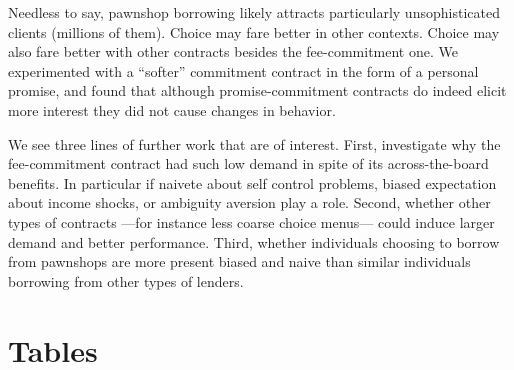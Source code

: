 \documentclass[11pt]{article}
\begin{document}
Needless to say, pawnshop borrowing likely attracts particularly unsophisticated clients (millions of them). Choice may fare better in other contexts.  Choice may also fare better with other contracts besides the fee-commitment one. We experimented with a ``softer'' commitment contract in the form of a personal promise, and found that although promise-commitment contracts do indeed elicit more interest they did not cause changes in behavior. 

We see three lines of further work that are of interest. First, investigate why the fee-commitment contract had such low demand in spite of its across-the-board benefits. In particular if naivete about self control problems, biased expectation about income shocks, or ambiguity aversion play a role. Second, whether other types of contracts ---for instance less coarse choice menus--- could induce larger demand and better performance. Third, whether individuals choosing to borrow from pawnshops are more present biased and naive than similar individuals borrowing from other types of lenders.







\pagebreak


\clearpage

%
%







\singlespacing

\section{Tables}
\end{document}
